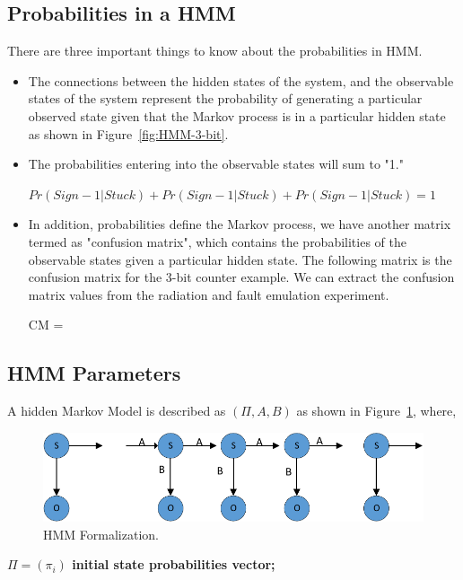 \subsection{Probabilities in a HMM}
There are three important things to know about the probabilities in HMM.
\begin{itemize}
\item The connections between the hidden states of the system, and the observable states of the system represent the probability of generating a particular observed state given that the Markov process is in a particular hidden state as shown in Figure~\ref{fig:HMM-3-bit}.
\item The probabilities entering into the observable states will sum to "1." 
\begin{center}
$Pr(Sign-1|Stuck) + Pr(Sign-1|Stuck) + Pr(Sign-1|Stuck)  = 1 $
\end{center}
\item In addition, probabilities define the Markov process, we have another matrix termed as "confusion matrix", which contains the probabilities of the observable states given a particular hidden state. The following matrix is the confusion matrix for the 3-bit counter example. We can extract the confusion matrix values from the radiation and fault emulation experiment.
\begin{center}
CM = 
\end{center}
\end{itemize}
\subsection{HMM Parameters}
A hidden Markov Model is described as $(\Pi, A, B)$ as shown in Figure~\ref{fig:MARKOV-SERIS}, where,
\begin{figure}[tb!]
 \centering
  \captionsetup{justification=centering}    
   \includegraphics[scale=0.8]{Figures/MARKOV-SERIS.pdf}
   \caption{HMM Formalization.}
\label{fig:MARKOV-SERIS}
\end{figure}
\textbf{$\Pi = (\pi_i)$ initial state probabilities vector;}

